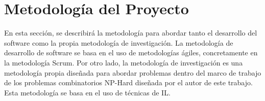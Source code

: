 \section{Metodología del Proyecto}
En esta sección, se describirá la metodología para abordar tanto el
desarrollo del software como la propia metodología de investigación. La metodología
de desarrollo de software se basa en el uso de metodologías ágiles\cite{Agile_Microsoft}, concretamente
en la metodología Scrum\cite{Atlassian_Scrum}. Por otro lado, la metodología de investigación es una
metodología propia diseñada para abordar problemas dentro del marco de trabajo de
los problemas combinatorios NP-Hard diseñada por el autor de este trabajo. Esta
metodología se basa en el uso de técnicas de IL.




\pagebreak